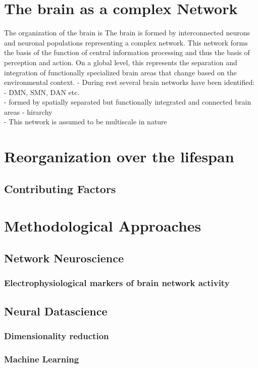 \section{The brain as a complex Network}
	The organization of the brain is 
	The brain is formed by interconnected neurons and neuronal populations representing a complex network. 
	This network forms the basis of the function of central information processing and thus the basis of 
	perception and action. On a global level, this represents the separation and integration of functionally 
	specialized brain areas that change based on the environmental context. 
	- During rest several brain networks have been identified:\\
	    - DMN, SMN, DAN etc. \\ 
		- formed by spatially separated but functionally integrated and connected brain areas
		- hirarchy\\
	- This network is assumed to be multiscale in nature \\
\section{Reorganization over the lifespan}
	\subsection{Contributing Factors}
\section{Methodological Approaches}
	\subsection{Network Neuroscience}
		\subsubsection{Electrophysiological markers of brain network activity}
	\subsection{Neural Datascience}
		\subsubsection{Dimensionality reduction}
		\subsubsection{Machine Learning}
